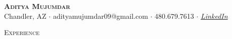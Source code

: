 \documentclass[a4paper]{article}
\newcommand{\lineunder} {
    \vspace*{-8pt} \\
    \hspace*{-18pt} \hrulefill \\
}
\newcommand{\header} [1] {
    {\hspace*{-18pt}\vspace*{6pt} \textsc{#1}}
    \vspace*{-6pt} \lineunder
}
\begin{document}
\vspace*{-40pt}

    

\vspace*{-10pt}
\begin{center}
	{\Huge \scshape \textbf{Aditya Mujumdar}}\\
    \vspace{1mm}
	{\normalsize {Chandler, AZ $\cdot$ adityamujumdar09@gmail.com $\cdot$ 480.679.7613 $\cdot$ \href{https://www.linkedin.com/in/aditya-mujumdar/}{\emph{LinkedIn}}}}\\
\end{center}




\header{\large{Experience}}
\vspace{1mm}
\end{document}
